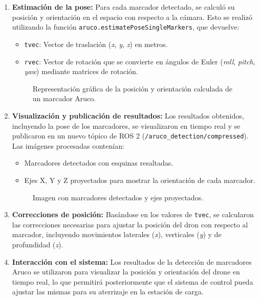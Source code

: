 \begin{enumerate}
        \item \textbf{Estimación de la pose:} 
        Para cada marcador detectado, se calculó su posición y orientación en el espacio con respecto a la cámara. Esto se realizó utilizando la función \texttt{aruco.estimatePoseSingleMarkers}, que devuelve:
        \begin{itemize}
            \item \texttt{tvec}: Vector de traslación (\textit{x}, \textit{y}, \textit{z}) en metros.
            \item \texttt{rvec}: Vector de rotación que se convierte en ángulos de Euler (\textit{roll}, \textit{pitch}, \textit{yaw}) mediante matrices de rotación.
        \end{itemize}
        \begin{center}
            \begin{figure}[h!]
                \centering
                \caption{Representación gráfica de la posición y orientación calculada de un marcador Aruco.}
            \end{figure}
        \end{center}
    
        \item \textbf{Visualización y publicación de resultados:} 
        Los resultados obtenidos, incluyendo la pose de los marcadores, se visualizaron en tiempo real y se publicaron en un nuevo tópico de ROS 2 (\texttt{/aruco\_detection/compressed}). Las imágenes procesadas contenían:
        \begin{itemize}
            \item Marcadores detectados con esquinas resaltadas.
            \item Ejes X, Y y Z proyectados para mostrar la orientación de cada marcador.
        \end{itemize}
        \begin{center}
            \begin{figure}[h!]
                \centering
                \caption{Imagen con marcadores detectados y ejes proyectados.}
            \end{figure}
        \end{center}
    
        \item \textbf{Correcciones de posición:} 
        Basándose en los valores de \texttt{tvec}, se calcularon las correcciones necesarias para ajustar la posición del dron con respecto al marcador, incluyendo movimientos laterales (\textit{x}), verticales (\textit{y}) y de profundidad (\textit{z}).
    
        \item \textbf{Interacción con el sistema:} 
        Los resultados de la detección de marcadores Aruco se utilizaron para visualizar la posición y orientación del drone en tiempo real, lo que permitirá posteriormente que el sistema de control pueda ajustar las mismas para su aterrizaje en la estación de carga.
    \end{enumerate}
    

